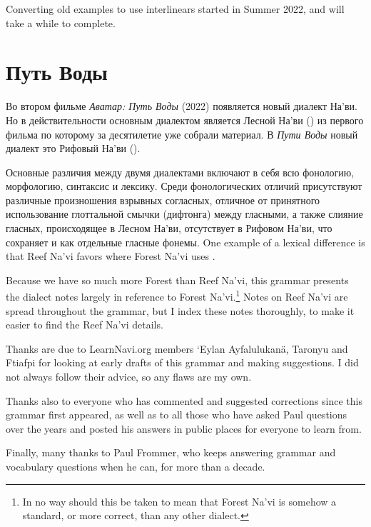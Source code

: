 Converting old examples to use interlinears started in Summer 2022,
and will take a while to complete.


\section{Путь Воды}
Во втором фильме \textit{Аватар: Путь Воды} (2022) появляется новый диалект На'ви.  Но в действительности основным диалектом является Лесной На'ви () из первого фильма по которому за десятилетие уже собрали материал.
В \textit{Пути Воды}  новый диалект это Рифовый На'ви ().

Основные различия между двумя диалектами включают в себя всю
фонологию, морфологию, синтаксис и лексику.  Среди фонологических отличий присутствуют различные произношения взрывных согласных, отличное от принятного использование глоттальной смычки (дифтонга) между гласными, а также слияние гласных, происходящее в Лесном На'ви, отсутствует в Рифовом На'ви, что сохраняет  и  как отдельные гласные фонемы.
One example of a lexical difference is that Reef Na'vi
favors   where Forest Na'vi uses .

Because we have so much more Forest than Reef Na'vi, this grammar
presents the dialect notes largely in reference to Forest
Na'vi.\footnote{In no way should this be taken to mean that Forest
Na'vi is somehow a standard, or more correct, than any other dialect.}
Notes on Reef Na'vi are spread throughout the grammar, but I index
these notes thoroughly, to make it easier to find the Reef Na'vi
details.



\vfill
Thanks are due to LearnNavi.org members `Eylan Ayfalulukanä, Taronyu
and Ftiafpi for looking at early drafts of this grammar and making
suggestions.  I did not always follow their advice, so any flaws are
my own.

Thanks also to everyone who has commented and suggested corrections
since this grammar first appeared, as well as to all those who have
asked Paul questions over the years and posted his answers in public
places for everyone to learn from.

Finally, many thanks to Paul Frommer, who keeps answering grammar
and vocabulary ques\-tions when he can, for more than a decade.



\bigskip
